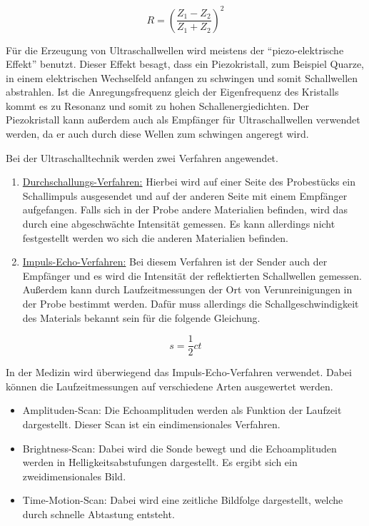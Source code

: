 \begin{equation*}
  R = \left( \frac{Z_1 - Z_2}{Z_1 + Z_2} \right)^2
\end{equation*}

Für die Erzeugung von Ultraschallwellen wird meistens der \enquote{piezo-elektrische Effekt}
benutzt. Dieser Effekt besagt, dass ein Piezokristall, zum Beispiel Quarze, in einem
elektrischen Wechselfeld anfangen zu schwingen und somit Schallwellen abstrahlen.
Ist die Anregungsfrequenz gleich der Eigenfrequenz des Kristalls kommt es zu Resonanz
und somit zu hohen Schallenergiedichten.
Der Piezokristall kann außerdem auch als Empfänger für Ultraschallwellen verwendet
werden, da er auch durch diese Wellen zum schwingen angeregt wird.

Bei der Ultraschalltechnik werden zwei Verfahren angewendet.

\begin{enumerate}
  \item \underline{Durchschallungs-Verfahren:} Hierbei wird auf einer Seite des Probestücks
  ein Schallimpuls ausgesendet und auf der anderen Seite mit einem Empfänger aufgefangen.
  Falls sich in der Probe andere Materialien befinden, wird das durch eine abgeschwächte
  Intensität gemessen. Es kann allerdings nicht festgestellt werden wo sich die anderen
  Materialien befinden.
  \item \underline{Impuls-Echo-Verfahren:} Bei diesem Verfahren ist der Sender auch der Empfänger
  und es wird die Intensität der reflektierten Schallwellen gemessen. Außerdem kann
  durch Laufzeitmessungen der Ort von Verunreinigungen in der Probe bestimmt werden.
  Dafür muss allerdings die Schallgeschwindigkeit des Materials bekannt sein für die
  folgende Gleichung.
\end{enumerate}

\begin{equation}
  s = \frac{1}{2} c t
  \label{eq:1}
\end{equation}

In der Medizin wird überwiegend das Impuls-Echo-Verfahren verwendet. Dabei können die
Laufzeitmessungen auf verschiedene Arten ausgewertet werden.

\begin{itemize}
  \item Amplituden-Scan: Die Echoamplituden werden als Funktion der Laufzeit dargestellt.
  Dieser Scan ist ein eindimensionales Verfahren.
  \item Brightness-Scan: Dabei wird die Sonde bewegt und die Echoamplituden werden in
  Helligkeitsabstufungen dargestellt. Es ergibt sich ein zweidimensionales Bild.
  \item Time-Motion-Scan: Dabei wird eine zeitliche Bildfolge dargestellt, welche
  durch schnelle Abtastung entsteht.
\end{itemize}
